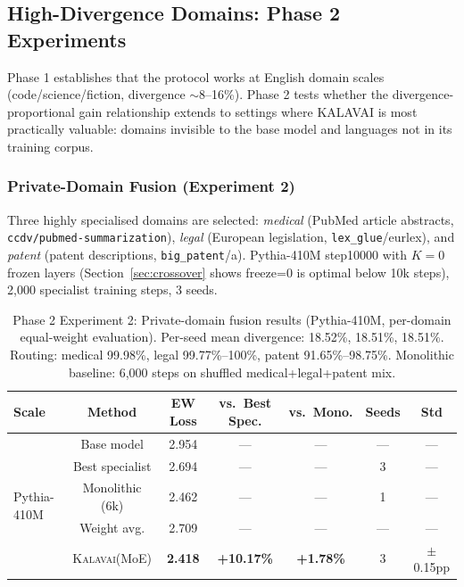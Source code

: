 \documentclass{article}
\newcommand{\kalavai}{\textsc{Kalavai}\xspace}
\begin{document}
\subsection{High-Divergence Domains: Phase 2 Experiments}
\label{sec:phase2}

Phase 1 establishes that the protocol works at English domain scales (code/science/fiction, divergence $\sim$8--16\%). Phase 2 tests whether the divergence-proportional gain relationship extends to settings where KALAVAI is most practically valuable: domains invisible to the base model and languages not in its training corpus.

\subsubsection{Private-Domain Fusion (Experiment 2)}
\label{sec:phase2_private}

Three highly specialised domains are selected: \emph{medical} (PubMed article abstracts, \texttt{ccdv/pubmed-summarization}), \emph{legal} (European legislation, \texttt{lex\_glue}/eurlex), and \emph{patent} (patent descriptions, \texttt{big\_patent}/a). Pythia-410M step10000 with $K=0$ frozen layers (Section~\ref{sec:crossover} shows freeze=0 is optimal below 10k steps), 2,000 specialist training steps, 3 seeds.

\begin{table}[h]
\centering
\caption{Phase 2 Experiment 2: Private-domain fusion results (Pythia-410M, per-domain equal-weight evaluation). Per-seed mean divergence: 18.52\%, 18.51\%, 18.51\%. Routing: medical 99.98\%, legal 99.77\%--100\%, patent 91.65\%--98.75\%. Monolithic baseline: 6,000 steps on shuffled medical+legal+patent mix.}
\label{tab:phase2_private}
\small
\begin{tabular}{lcccccc}
\toprule
\textbf{Scale} & \textbf{Method} & \textbf{EW Loss} & \textbf{vs.\ Best Spec.} & \textbf{vs.\ Mono.} & \textbf{Seeds} & \textbf{Std} \\
\midrule
\multirow{5}{*}{Pythia-410M}
 & Base model       & 2.954 & ---     & ---     & ---  & ---   \\
 & Best specialist  & 2.694 & ---     & ---     & 3    & ---   \\
 & Monolithic (6k)  & 2.462 & ---     & ---     & 1    & ---   \\
 & Weight avg.      & 2.709 & ---     & ---     & ---  & ---   \\
 & \kalavai (MoE)   & \textbf{2.418} & \textbf{+10.17\%} & \textbf{+1.78\%} & 3 & $\pm$0.15pp \\
\bottomrule
\end{tabular}
\end{table}
\end{document}

